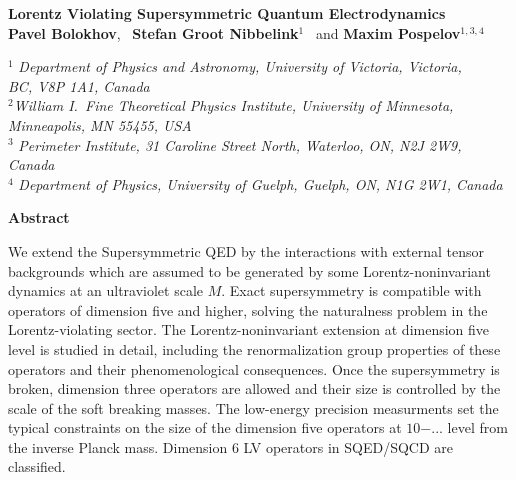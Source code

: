 \documentclass[paper,12pt]{revtex4}
\begin{document}
\begin{titlepage}
\renewcommand{\thefootnote}{\fnsymbol{footnote}}

\begin{center}
\vspace{0.5cm}

\large {\bf Lorentz Violating Supersymmetric Quantum Electrodynamics}\\[3mm]
  
\vspace*{0.5cm}
\normalsize
{\bf Pavel Bolokhov}, ~{\bf Stefan Groot Nibbelink}$^{1}$%
\ and
{\bf Maxim Pospelov}$^{1,3,4}$%

\vspace*{0.5cm}
$^{1}$ {\it Department of Physics and Astronomy,
University of Victoria, Victoria,\\ BC, V8P 1A1, Canada}\\
$^{2}${\it William I.\ Fine Theoretical Physics Institute,
University of Minnesota,\\ Minneapolis, MN 55455, USA}\\
$^{3}$ {\it Perimeter Institute, 31 Caroline Street North,
Waterloo, ON,  N2J 2W9,
Canada}\\
$^{4}$ {\it Department of Physics,
 University of Guelph,
 Guelph, ON,  N1G 2W1, Canada}
 \end{center}

\centerline{\large\bf Abstract}
We extend the Supersymmetric QED by the interactions with external 
tensor backgrounds which are assumed to be generated by some Lorentz-noninvariant 
dynamics at an ultraviolet scale $M$. Exact supersymmetry is compatible with operators 
of dimension five and higher, solving the naturalness problem in the 
Lorentz-violating sector. The Lorentz-noninvariant extension at 
dimension five level is studied in detail, including the 
renormalization group properties of these 
operators and their phenomenological consequences. 
Once the supersymmetry is broken, dimension three operators are 
allowed and their size is controlled by the scale of the 
soft breaking masses. The low-energy precision measurments 
set the typical constraints on the size of the dimension 
five operators at $10{-...}$ level from the inverse Planck mass. 
Dimension 6 LV operators in SQED/SQCD are classified.



\end{titlepage}
\end{document}
